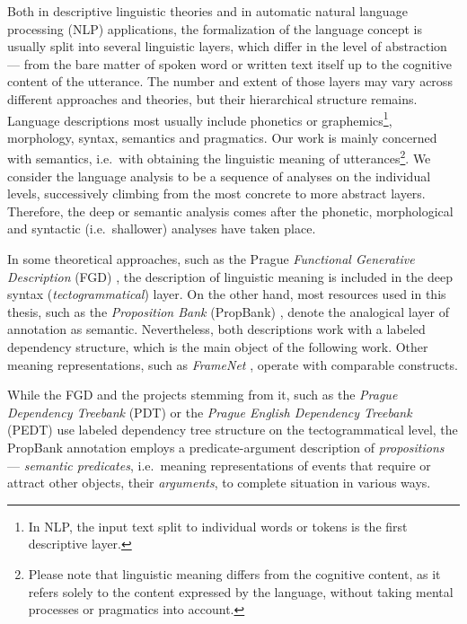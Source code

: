 \documentclass[12pt,notitlepage,a4paper]{report}
\begin{document}
Both in descriptive linguistic theories and in automatic natural language processing (NLP) applications, the formalization of the language concept is usually split into several linguistic layers, which differ in the level of abstraction --- from the bare matter of spoken word or written text itself up to the cognitive content of the utterance. The number and extent of those layers may vary across different approaches and theories, but their hierarchical structure remains. Language descriptions most usually include phonetics or graphemics\footnote{In NLP, the input text split to individual words or tokens is the first descriptive layer.}, morphology, syntax, semantics and pragmatics. Our work is mainly concerned with semantics, i.e.\ with obtaining the linguistic meaning \citep[p.~35ff.]{sgall86} of utterances\footnote{Please note that linguistic meaning differs from the cognitive content, as it refers solely to the content expressed by the language, without taking mental processes or pragmatics into account.}. We consider the language analysis to be a sequence of analyses on the individual levels, successively climbing from the most concrete to more abstract layers. Therefore, the deep or semantic analysis comes after the phonetic, morphological and syntactic (i.e.\ shallower) analyses have taken place.

In some theoretical approaches, such as the Prague \emph{Functional Generative Description} (FGD) \citep{sgall86}, the description of linguistic meaning is included in the deep syntax (\emph{tectogrammatical}) layer. On the other hand, most resources used in this thesis, such as the \emph{Proposition Bank} (PropBank) \linebreak[4] \citep{palmer05}, denote the analogical layer of annotation as semantic. Nevertheless, both descriptions work with a labeled dependency structure, which is the main object of the following work. Other meaning representations, such as \emph{Frame\-Net} \citep{baker98}, operate with comparable constructs.

While the FGD and the projects stemming from it, such as the \emph{Prague Dependency Treebank} (PDT) \citep{hajic06} or the \emph{Prague English Dependency Treebank} (PEDT) \citep{cinkova09} use labeled dependency tree structure on the tectogrammatical level, the PropBank annotation \citep{kingsbury03} employs a predicate-argument description of \emph{propositions} --- \emph{semantic predicates}, i.e.\ meaning representations of events that require or attract other objects, their \emph{arguments}, to complete situation in various ways.
\end{document}
